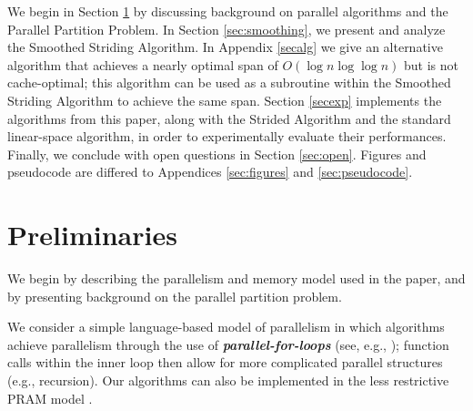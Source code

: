 \documentclass[sigplan, 10pt, nonacm]{acmart}
\newcommand{\defn}[1]{{\textit{\textbf{\boldmath #1}}}}
\renewcommand{\paragraph}[1]{\vspace{0.09in}\noindent{\bf \boldmath #1.}}
\theoremstyle{remark}
\theoremstyle{remark}
\begin{document}


\paragraph{Outline} We begin in Section \ref{secprelim} by discussing
background on parallel algorithms and the Parallel Partition Problem. In
Section \ref{sec:smoothing}, we present and analyze the Smoothed
Striding Algorithm. In Appendix \ref{secalg} we give an alternative
algorithm that achieves a nearly optimal span of
$O(\log n \log \log n)$ but is not cache-optimal; this algorithm can
be used as a subroutine within the Smoothed Striding Algorithm to
achieve the same span. Section \ref{secexp} implements the algorithms
from this paper, along with the Strided Algorithm and the standard
linear-space algorithm, in order to experimentally evaluate their
performances. Finally, we conclude with open questions in Section
\ref{sec:open}. Figures and pseudocode are differed to Appendices
\ref{sec:figures} and \ref{sec:pseudocode}.


\section{Preliminaries}\label{secprelim}

We begin by describing the parallelism and memory model used in
the paper, and by presenting background on the parallel partition problem.

\paragraph{Workflow Model} We consider a simple language-based model of parallelism in which algorithms achieve parallelism through the use of \defn{parallel-for-loops} (see, e.g.,
\cite{Blelloch96,AcarBl16,CLRS}); function calls within the inner loop
then allow for more complicated parallel structures (e.g., recursion). Our algorithms can also be implemented in the less restrictive PRAM model \cite{Blelloch96, AcarBl16}.
\end{document}
